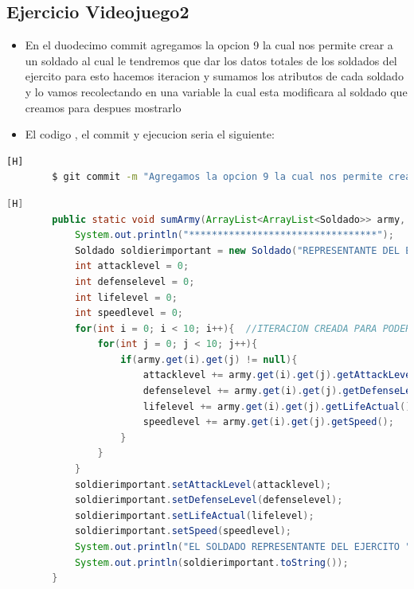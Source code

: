 \documentclass{article}
\begin{document}
	\subsection{Ejercicio Videojuego2}
	\begin{itemize}	
		\item En el duodecimo commit agregamos la opcion 9 la cual nos permite crear a un soldado al cual le tendremos que dar los datos totales de los soldados del ejercito para esto hacemos iteracion y sumamos los atributos de cada soldado y lo vamos recolectando en una variable la cual esta modificara al soldado que creamos para despues mostrarlo
		\item El codigo , el commit y ejecucion seria el siguiente:
	\end{itemize}	
	\begin{lstlisting}[language=bash,caption={Commit}][H]
		$ git commit -m "Agregamos la opcion 9 la cual nos permite crear a un soldado al cual le tendremos que dar los datos totales de los soldados del ejercito para esto hacemos iteracion y sumamos los atributos de cada soldado y lo vamos recolectando en una variable la cual esta modificara al soldado que creamos para despues mostrarlo"
	\end{lstlisting}	
	\begin{lstlisting}[language=java,caption={Las lineas de codigos del metodo creado:}][H]
		public static void sumArmy(ArrayList<ArrayList<Soldado>> army, int num){
			System.out.println("*********************************");
			Soldado soldierimportant = new Soldado("REPRESENTANTE DEL EJERCITO 1" , 0 , 0 , 0 , 0 , false , 0 , "#");
			int attacklevel = 0;
			int defenselevel = 0;
			int lifelevel = 0;
			int speedlevel = 0;
			for(int i = 0; i < 10; i++){  //ITERACION CREADA PARA PODER SABER QUE SI ESTE BANDO DEL EJERCITO TIENE SOLDADOS PARA PODER JUGAR SI TIENE 10 ESTA OPCION ESTA CANCELADA
				for(int j = 0; j < 10; j++){
					if(army.get(i).get(j) != null){
						attacklevel += army.get(i).get(j).getAttackLevel();
						defenselevel += army.get(i).get(j).getDefenseLevel();
						lifelevel += army.get(i).get(j).getLifeActual();
						speedlevel += army.get(i).get(j).getSpeed();
					}
				}
			}
			soldierimportant.setAttackLevel(attacklevel);
			soldierimportant.setDefenseLevel(defenselevel);
			soldierimportant.setLifeActual(lifelevel);
			soldierimportant.setSpeed(speedlevel);
			System.out.println("EL SOLDADO REPRESENTANTE DEL EJERCITO " + num + " EL CONTENDRA LA SUMA DE LOS ATRIBUTOS DE LOS SOLDADOS DE TODO EL EJERCITO");
			System.out.println(soldierimportant.toString());
		}
	\end{lstlisting}
\end{document}

